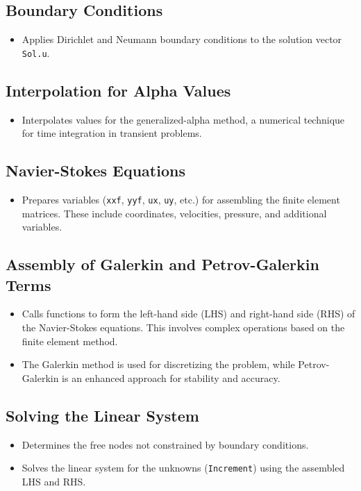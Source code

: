 \documentclass[a4paper,12pt]{article} %
\begin{document}
\subsection*{Boundary Conditions}
\begin{itemize}
    \item Applies Dirichlet and Neumann boundary conditions to the solution vector \texttt{Sol.u}.
\end{itemize}

\subsection*{Interpolation for Alpha Values}
\begin{itemize}
    \item Interpolates values for the generalized-alpha method, a numerical technique for time integration in transient problems.
\end{itemize}

\subsection*{Navier-Stokes Equations}
\begin{itemize}
    \item Prepares variables (\texttt{xxf}, \texttt{yyf}, \texttt{ux}, \texttt{uy}, etc.) for assembling the finite element matrices. These include coordinates, velocities, pressure, and additional variables.
\end{itemize}

\subsection*{Assembly of Galerkin and Petrov-Galerkin Terms}
\begin{itemize}
    \item Calls functions to form the left-hand side (LHS) and right-hand side (RHS) of the Navier-Stokes equations. This involves complex operations based on the finite element method.
    \item The Galerkin method is used for discretizing the problem, while Petrov-Galerkin is an enhanced approach for stability and accuracy.
\end{itemize}

\subsection*{Solving the Linear System}
\begin{itemize}
    \item Determines the free nodes not constrained by boundary conditions.
    \item Solves the linear system for the unknowns (\texttt{Increment}) using the assembled LHS and RHS.
\end{itemize}
\end{document}

